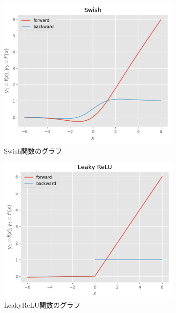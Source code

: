 \documentclass{ltjsarticle}
\begin{document}
\begin{figure}[ht]
  \centering
  \begin{subfigure}[b]{0.45\textwidth}
    \centering
    \includegraphics[width=\textwidth]{./capture/Swish.png}
    \caption{Swish関数のグラフ}
    \label{fig:Swish}
  \end{subfigure}
  \hfill
  \begin{subfigure}[b]{0.45\textwidth}
    \centering
    \includegraphics[width=\textwidth]{./capture/LeakyReLU.png}
    \caption{LeakyReLU関数のグラフ}
    \label{fig:LeakyReLU}
  \end{subfigure}
  \caption{}
\end{figure}
\end{document}
